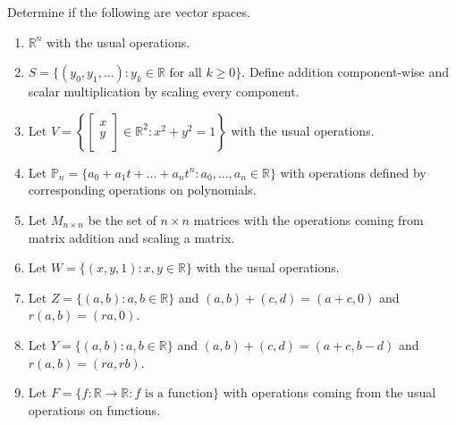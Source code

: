 \begin{enumerate}

\Problem Determine if the following are vector spaces.

\begin{enumerate}
\item $\mathbb{R}^n$ with the usual operations.

\vfill
\item $S=\{(y_0, y_1, \dots ): y_k \in \mathbb{R} \text{ for  all } k \geq 0\}$. Define addition component-wise and scalar multiplication by scaling every component.

\vfill

\newpage

\item Let $V= \left\{ \begin{bmatrix} x\\ y\\ \end{bmatrix} \in \mathbb{R}^2 : x^2+y^2 =1 \right \}$ with the usual operations.

\vfill
\item Let $\mathbb{P}_n =\{ a_0+a_1 t +\dots + a_n t^n : a_0, \dots, a_n \in \mathbb{R} \}$ with operations defined by corresponding operations on polynomials.

\vfill
\item Let $M_{n\times n}$ be the set of $n\times n$ matrices with the operations coming from matrix addition and scaling a matrix.

\vfill

\item Let $W=\{(x,y,1): x,y\in \mathbb{R} \}$ with the usual operations.

\vfill

\item Let $Z=\{(a,b) : a,b \in \mathbb{R} \}$ and $(a,b)+(c,d)=(a+c,0)$ and $r(a,b)=(ra,0)$.

\vfill

\item Let $Y=\{(a,b) : a,b \in \mathbb{R} \}$ and $(a,b)+(c,d)=(a+c,b-d)$ and $r(a,b)=(ra,rb)$.

\vfill

\item Let $F=\{ f: \mathbb{R} \to \mathbb{R} : f \text{ is a function} \}$ with operations coming from the usual operations on functions.

\vfill
\newpage

\end{enumerate}


\end{enumerate}
